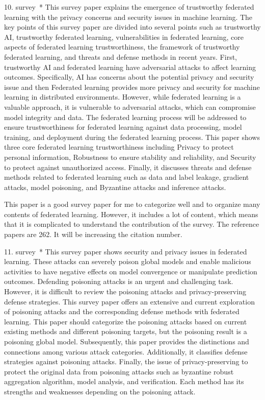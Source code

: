 \documentclass[manuscript,screen,review]{acmart}
\begin{document}
10. survey~\cite{zhang2023survey}*
This survey paper explains the emergence of trustworthy federated learning with the privacy concerns and security issues in machine learning. The key points of this survey paper are divided into several points such as trustworthy AI, trustworthy federated learning, vulnerabilities in federated learning, core aspects of federated learning trustworthiness, the framework of trustworthy federated learning, and threats and defense methods in recent years. First, trustworthy AI and federated learning have adversarial attacks to affect learning outcomes. Specifically, AI has concerns about the potential privacy and security issue and then Federated learning provides more privacy and security for machine learning in distributed environments. However, while federated learning is a valuable approach, it is vulnerable to adversarial attacks, which can compromise model integrity and data. The federated learning process will be addressed to ensure trustworthiness for federated learning against data processing, model training, and deployment during the federated learning process. This paper shows three core federated learning trustworthiness including Privacy to protect personal information, Robustness to ensure stability and reliability, and Security to protect against unauthorized access. Finally, it discusses threats and defense methods related to federated learning such as data and label leakage, gradient attacks, model poisoning, and Byzantine attacks and inference attacks.

This paper is a good survey paper for me to categorize well and to organize many contents of federated learning. However, it includes a lot of content, which means that it is complicated to understand the contribution of the survey. The reference papers are 262. It will be increasing the citation number.    


11. survey~\cite{xia2023poisoning}*
This survey paper shows security and privacy issues in federated learning. These attacks can severely poison global models and enable malicious activities to have negative effects on model convergence or manipulate prediction outcomes. Defending poisoning attacks is an urgent and challenging task. However, it is difficult to review the poisoning attacks and privacy-preserving defense strategies. This survey paper offers an extensive and current exploration of poisoning attacks and the corresponding defense methods with federated learning. This paper should categorize the poisoning attacks based on current existing methods and different poisoning targets, but the poisoning result is a poisoning global model. Subsequently, this paper provides the distinctions and connections among various attack categories. Additionally, it classifies defense strategies against poisoning attacks. Finally, the issue of privacy-preserving to protect the original data from poisoning attacks such as byzantine robust aggregation algorithm, model analysis, and verification. Each method has its strengths and weaknesses depending on the poisoning attack.      
\end{document}

